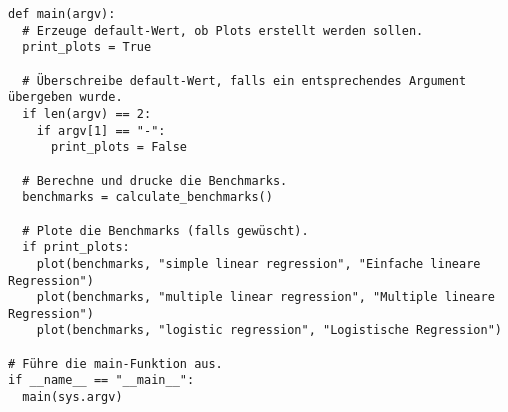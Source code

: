 \begin{verbatim}
def main(argv):
  # Erzeuge default-Wert, ob Plots erstellt werden sollen.
  print_plots = True

  # Überschreibe default-Wert, falls ein entsprechendes Argument übergeben wurde.
  if len(argv) == 2:
    if argv[1] == "-":
      print_plots = False

  # Berechne und drucke die Benchmarks.
  benchmarks = calculate_benchmarks()

  # Plote die Benchmarks (falls gewüscht).
  if print_plots:
    plot(benchmarks, "simple linear regression", "Einfache lineare Regression")
    plot(benchmarks, "multiple linear regression", "Multiple lineare Regression")
    plot(benchmarks, "logistic regression", "Logistische Regression")

# Führe die main-Funktion aus.
if __name__ == "__main__":
  main(sys.argv)
\end{verbatim}
